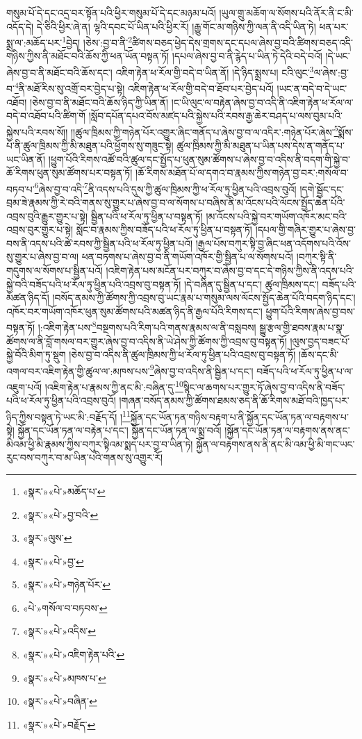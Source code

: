 གསུམ་པོ་དེ་དང་འདྲ་བར་སྟོན་པའི་ཕྱིར་གསུམ་པོ་དེ་དང་མཉམ་པའོ། །ཡུལ་གྲུ་མཆོག་ལ་སོགས་པའི་ནོར་ནི་ང་མི་འདོད་དེ། དེ་ཅིའི་ཕྱིར་ཞེ་ན། ལྷའི་དབང་པོ་ཡིན་པའི་ཕྱིར་རོ། །རྒྱུ་གོང་མ་གཉིས་ཀྱི་ལན་ནི་འདི་ཡིན་ཏེ། ཕན་པར་སྨྲ་ལ་:མཆོད་པར་\footnote{«སྣར་»«པེ་»མཆོད་པ་}བྱེད། །ཅེས་:བྱ་བ་ནི་\footnote{«སྣར་»«པེ་»བྱ་བའི་}ཚིགས་བཅད་ཕྱེད་དེས་གྲགས་དང་དཔལ་ཞེས་བྱ་བའི་ཚིགས་བཅད་འདི་གཉིས་ཀྱིས་ནི་མཐོང་བའི་ཆོས་ཀྱི་ཕན་ཡོན་བསྟན་ཏོ། །དཔལ་ཞེས་བྱ་བ་ནི་རྙེད་པ་ཡིན་ཏེ་དེའི་བདེ་བའོ། །དེ་ཡང་ཞེས་བྱ་བ་ནི་མཐོང་བའི་ཆོས་དང་། འཇིག་རྟེན་ཕ་རོལ་གྱི་བདེ་བ་ཡིན་ནོ། །དེ་ཉིད་སྨྲས་པ། ངའི་ལུང་\footnote{«སྣར་»ལུས་}ལ་ཞེས་:བྱ་བ་\footnote{«སྣར་»«པེ་»བྱ་}ནི་མཐོ་རིས་སུ་འགྲོ་བར་བྱེད་པ་སྟེ། འཇིག་རྟེན་ཕ་རོལ་གྱི་བདེ་བ་ཐོབ་པར་བྱེད་པའོ། །ཡང་ན་བདེ་བ་དེ་ཡང་འཐོབ། །ཅེས་བྱ་བ་ནི་མཐོང་བའི་ཆོས་ཉིད་ཀྱི་ཡིན་ནོ། །ང་ཡི་ལུང་ལ་བརྟེན་ཞེས་བྱ་བ་འདི་ནི་འཇིག་རྟེན་ཕ་རོལ་ལ་བདེ་བ་འཐོབ་པའི་ཚིག་གོ །སློབ་དཔོན་དཔའ་བོས་མཛད་པའི་སྐྱེས་པའི་རབས་རྒྱ་ཆེར་བཤད་པ་ལས་བུམ་པའི་སྐྱེས་པའི་རབས་སོ།། །།ཚུལ་ཁྲིམས་ཀྱི་གཉེན་པོར་འགྱུར་ཞིང་གནོད་པ་ཞེས་བྱ་བ་ལ་འདིར་:གཉེན་པོར་ཞེས་\footnote{«སྣར་»«པེ་»གཉེན་པོར་}སྨོས་པ་ནི་ཚུལ་ཁྲིམས་ཀྱི་མི་མཐུན་པའི་ཕྱོགས་སུ་གཟུང་སྟེ། ཚུལ་ཁྲིམས་ཀྱི་མི་མཐུན་པ་ཡིན་པས་དེས་ན་གནོད་པ་ཡང་ཡིན་ནོ། །ཕྱུག་པོའི་རིགས་འཚོ་བའི་ཚུལ་དང་སྤྱོད་པ་ཕུན་སུམ་ཚོགས་པ་ཞེས་བྱ་བ་འདིས་ནི་བདག་གི་སྐྱེ་བ་ཆོ་རིགས་ཕུན་སུམ་ཚོགས་པར་བསྟན་ཏོ། །ཆོ་རིགས་མཐོན་པོ་ལ་དགའ་བ་རྣམས་ཀྱིས་གཉེན་བྱ་བར་:གསོལ་བ་བཏབ་པ་\footnote{«པེ་»གསོལ་བ་བཏབས་}ཞེས་བྱ་བ་འདི་\footnote{«སྣར་»«པེ་»འདིས་}ནི་འདས་པའི་དུས་ཀྱི་ཚུལ་ཁྲིམས་ཀྱི་ཕ་རོལ་ཏུ་ཕྱིན་པའི་འབྲས་བུའོ། །དགེ་སྦྱོང་དང་བྲམ་ཟེ་རྣམས་ཀྱི་རེ་བའི་གནས་སུ་གྱུར་པ་ཞེས་བྱ་བ་ལ་སོགས་པ་བཞིས་ནི་མ་འོངས་པའི་ལོངས་སྤྱོད་ཆེན་པོའི་འབྲས་བུའི་རྒྱུར་གྱུར་པ་སྟེ། སྦྱིན་པའི་ཕ་རོལ་ཏུ་ཕྱིན་པ་བསྟན་ཏོ། །མ་འོངས་པའི་སྐྱེ་བར་གཡོག་འཁོར་མང་བའི་འབྲས་བུར་གྱུར་པ་སྟེ། སློང་བ་རྣམས་ཀྱིས་བཟོད་པའི་ཕ་རོལ་ཏུ་ཕྱིན་པ་བསྟན་ཏོ། །དཔལ་གྱི་གཞིར་གྱུར་པ་ཞེས་བྱ་བས་ནི་འདས་པའི་ཚེ་རབས་ཀྱི་སྦྱིན་པའི་ཕ་རོལ་ཏུ་ཕྱིན་པའོ། །རྒྱལ་པོས་བཀུར་སྟི་བྱ་ཞིང་ཕན་འདོགས་པའི་འོས་སུ་གྱུར་པ་ཞེས་བྱ་བ་ལ། ཕན་བཏགས་པ་ཞེས་བྱ་བ་ནི་གཡོག་འཁོར་གྱི་སྦྱིན་པ་ལ་སོགས་པའོ། །བཀུར་སྟི་ནི་གདུགས་ལ་སོགས་པ་སྦྱིན་པའོ། །འཇིག་རྟེན་པས་མངོན་པར་བཀུར་བ་ཞེས་བྱ་བ་དང་དེ་གཉིས་ཀྱིས་ནི་འདས་པའི་སྐྱེ་བའི་བཟོད་པའི་ཕ་རོལ་ཏུ་ཕྱིན་པའི་འབྲས་བུ་བསྟན་ཏོ། །དེ་བཞིན་དུ་སྦྱིན་པ་དང་། ཚུལ་ཁྲིམས་དང་། བཟོད་པའི་མཚན་ཉིད་དོ། །བསོད་ནམས་ཀྱི་ཚོགས་ཀྱི་འབྲས་བུ་ཡང་རྣམ་པ་གསུམ་ལས་ལོངས་སྤྱོད་ཆེན་པོའི་བདག་ཉིད་དང་། འཁོར་བར་གཡོག་འཁོར་ཕུན་སུམ་ཚོགས་པའི་མཚན་ཉིད་ནི་རྒྱལ་པོའི་རིགས་དང་། ཕྱུག་པོའི་རིགས་ཞེས་བྱ་བས་བསྟན་ཏོ། །:འཇིག་རྟེན་པས་\footnote{«སྣར་»«པེ་»འཇིག་རྟེན་པའི་}བསྔགས་པའི་རིག་པའི་གནས་རྣམས་ལ་ནི་བསླབས། སྒྱུ་རྩལ་གྱི་ཐབས་རྣམ་པ་སྣ་ཚོགས་ལ་ནི་བློ་གསལ་བར་གྱུར་ཞེས་བྱ་བ་འདིས་ནི་ཡེ་ཤེས་ཀྱི་ཚོགས་ཀྱི་འབྲས་བུ་བསྟན་ཏོ། །ལུས་བྱད་བཟང་པོ་སྐྱེ་བོའི་མིག་ཏུ་སྡུག །ཅེས་བྱ་བ་འདིས་ནི་ཚུལ་ཁྲིམས་ཀྱི་ཕ་རོལ་ཏུ་ཕྱིན་པའི་འབྲས་བུ་བསྟན་ཏོ། །ཆོས་དང་མི་འགལ་བར་འཇིག་རྟེན་གྱི་ཚུལ་ལ་:མཁས་པས་\footnote{«སྣར་»«པེ་»མཁས་པ་}ཞེས་བྱ་བ་འདིས་ནི་སྦྱིན་པ་དང་། བཟོད་པའི་ཕ་རོལ་ཏུ་ཕྱིན་པ་ལ་འཇུག་པའོ། །འཇིག་རྟེན་པ་རྣམས་ཀྱི་ནང་མི་:བཞིན་དུ་\footnote{«སྣར་»«པེ་»བཞིན་}སྙིང་ལ་ཆགས་པར་གྱུར་ཏོ་ཞེས་བྱ་བ་འདིས་ནི་བཟོད་པའི་ཕ་རོལ་ཏུ་ཕྱིན་པའི་འབྲས་བུའོ། །གཞན་བསོད་ནམས་ཀྱི་ཚོགས་ཐམས་ཅད་ནི་ཆོ་རིགས་མཐོ་བའི་ཁྱད་པར་ཉིད་ཀྱིས་བསྟན་ཏེ་ཡང་མི་:བརྗོད་དོ། །\footnote{«སྣར་»«པེ་»བརྗོད་}སྐྱོན་དང་ཡོན་ཏན་གཉིས་བརྟག་པ་ནི་སྐྱོན་དང་ཡོན་ཏན་ལ་བརྟགས་པ་སྟེ། སྐྱོན་དང་ཡོན་ཏན་ལ་བརྟེན་པ་དང་། སྐྱོན་དང་ཡོན་ཏན་ལ་སྨྲ་བའོ། །སྐྱོན་དང་ཡོན་ཏན་ལ་བརྟགས་ནས་ནང་མིའམ་ཕྱི་མི་རྣམས་ཀྱིས་བཀུར་སྟིའམ་སྨད་པར་བྱ་བ་ཡིན་ཏེ། སྐྱོན་ལ་བརྟགས་ནས་ནི་ནང་མི་འམ་ཕྱི་མི་གང་ཡང་རུང་བས་བཀུར་བ་མ་ཡིན་པའི་གནས་སུ་འགྱུར་རོ། 